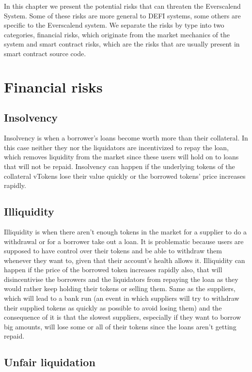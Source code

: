 
In this chapter we present the potential risks that can threaten the Everscalend System. Some of these risks are more general to DEFI systems, some others are specific to the Everscalend system. We separate the risks by type into two categories, financial risks, which originate from the market mechanics of the system and smart contract risks, which are the risks that are usually present in smart contract source code.

\section{Financial risks}

\subsection{Insolvency}

Insolvency is when a borrower's loans become worth more than their collateral. In this case neither they nor the liquidators are incentivized to repay the loan, which removes liquidity from the market since these users will hold on to loans that will not be repaid. Insolvency can happen if the underlying tokens of the collateral vTokens lose their value quickly or the borrowed tokens' price increases rapidly.

\subsection{Illiquidity}

Illiquidity is when there aren't enough tokens in the market for a supplier to do a withdrawal or for a borrower take out a loan. It is problematic because users are supposed to have control over their tokens and be able to withdraw them whenever they want to, given that their account's health allows it. Illiquidity can happen if the price of the borrowed token increases rapidly also, that will disincentivise the borrowers and the liquidators from repaying the loan as they would rather keep holding their tokens or selling them. Same as the suppliers, which will lead to a bank run (an event in which suppliers will try to withdraw their supplied tokens as quickly as possible to avoid losing them) and the consequence of it is that the slowest suppliers, especially if they want to borrow big amounts, will lose some or all of their tokens since the loans aren't getting repaid.

\subsection{Unfair liquidation}

